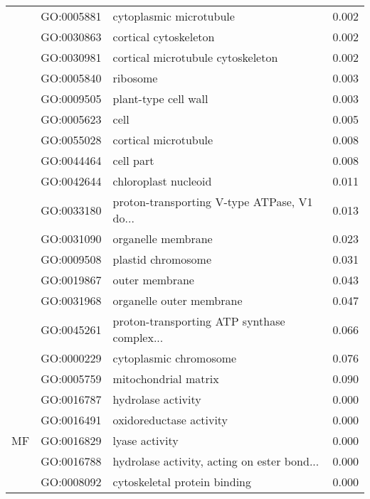 \begin{longtable}{lllr}
   & GO:0005881 &                      cytoplasmic microtubule &         0.002 \\
   & GO:0030863 &                        cortical cytoskeleton &         0.002 \\
   & GO:0030981 &            cortical microtubule cytoskeleton &         0.002 \\
   & GO:0005840 &                                     ribosome &         0.003 \\
   & GO:0009505 &                         plant-type cell wall &         0.003 \\
   & GO:0005623 &                                         cell &         0.005 \\
   & GO:0055028 &                         cortical microtubule &         0.008 \\
   & GO:0044464 &                                    cell part &         0.008 \\
   & GO:0042644 &                         chloroplast nucleoid &         0.011 \\
   & GO:0033180 &  proton-transporting V-type ATPase, V1 do... &         0.013 \\
   & GO:0031090 &                           organelle membrane &         0.023 \\
   & GO:0009508 &                           plastid chromosome &         0.031 \\
   & GO:0019867 &                               outer membrane &         0.043 \\
   & GO:0031968 &                     organelle outer membrane &         0.047 \\
   & GO:0045261 &  proton-transporting ATP synthase complex... &         0.066 \\
   & GO:0000229 &                       cytoplasmic chromosome &         0.076 \\
   & GO:0005759 &                         mitochondrial matrix &         0.090 \\
\cline{1-4}
\multirow{106}{*}{MF} & GO:0016787 &                           hydrolase activity &         0.000 \\
   & GO:0016491 &                      oxidoreductase activity &         0.000 \\
   & GO:0016829 &                               lyase activity &         0.000 \\
   & GO:0016788 &  hydrolase activity, acting on ester bond... &         0.000 \\
   & GO:0008092 &                 cytoskeletal protein binding &         0.000 \\

\end{longtable}
